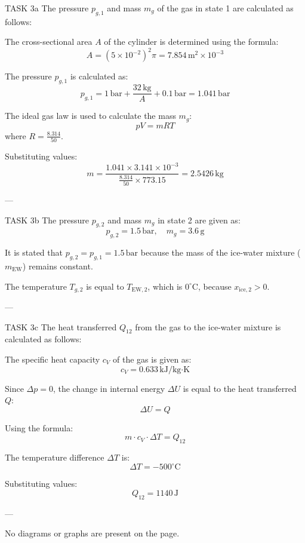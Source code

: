 TASK 3a  
The pressure \( p_{g,1} \) and mass \( m_g \) of the gas in state 1 are calculated as follows:  

The cross-sectional area \( A \) of the cylinder is determined using the formula:  
\[
A = (5 \times 10^{-2})^2 \pi = 7.854 \, \text{m}^2 \times 10^{-3}
\]  

The pressure \( p_{g,1} \) is calculated as:  
\[
p_{g,1} = 1 \, \text{bar} + \frac{32 \, \text{kg}}{A} + 0.1 \, \text{bar} = 1.041 \, \text{bar}
\]  

The ideal gas law is used to calculate the mass \( m_g \):  
\[
pV = mRT
\]  
where \( R = \frac{8.314}{50} \).  

Substituting values:  
\[
m = \frac{1.041 \times 3.141 \times 10^{-3}}{\frac{8.314}{50} \times 773.15} = 2.5426 \, \text{kg}
\]  

---

TASK 3b  
The pressure \( p_{g,2} \) and mass \( m_g \) in state 2 are given as:  
\[
p_{g,2} = 1.5 \, \text{bar}, \quad m_g = 3.6 \, \text{g}
\]  

It is stated that \( p_{g,2} = p_{g,1} = 1.5 \, \text{bar} \) because the mass of the ice-water mixture (\( m_{\text{EW}} \)) remains constant.  

The temperature \( T_{g,2} \) is equal to \( T_{\text{EW},2} \), which is \( 0^\circ\text{C} \), because \( x_{\text{ice},2} > 0 \).  

---

TASK 3c  
The heat transferred \( Q_{12} \) from the gas to the ice-water mixture is calculated as follows:  

The specific heat capacity \( c_V \) of the gas is given as:  
\[
c_V = 0.633 \, \text{kJ/kg·K}
\]  

Since \( \Delta p = 0 \), the change in internal energy \( \Delta U \) is equal to the heat transferred \( Q \):  
\[
\Delta U = Q
\]  

Using the formula:  
\[
m \cdot c_V \cdot \Delta T = Q_{12}
\]  

The temperature difference \( \Delta T \) is:  
\[
\Delta T = -500^\circ\text{C}
\]  

Substituting values:  
\[
Q_{12} = 1140 \, \text{J}
\]  

--- 

No diagrams or graphs are present on the page.